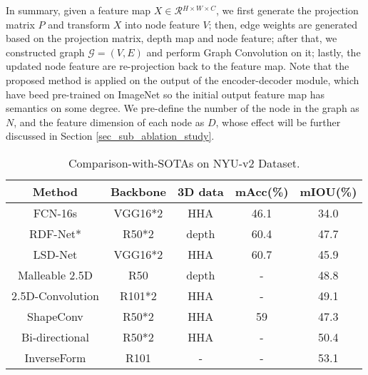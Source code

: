 ﻿\documentclass[journal]{IEEEtran}
\begin{document}
        In summary, given a feature map ${X} \in \mathcal{R}{^{H\times W\times C}}$, we first generate the projection matrix ${P}$ and transform $X$ into node feature $V$; then, edge weights are generated based on the projection matrix, depth map and node feature; after that, we constructed graph  $\mathcal{G}=(V, E)$ and perform Graph Convolution on it; lastly, the updated node feature are re-projection back to the feature map. Note that the proposed method is applied on the output of the encoder-decoder module, which have beed pre-trained on ImageNet so the initial output feature map has semantics on some degree. We pre-define the number of the node in the graph as $N$, and the feature dimension of each node as $D$, whose effect will be further discussed in Section \ref{sec_sub_ablation_study}.  


    \begin{table}
        \caption{Comparison-with-SOTAs on NYU-v2 Dataset.}\label{table_nyu_sota}
        \centering
        \begin{tabular}{c|c|c|c|c}
            \hline
            Method & Backbone & 3D data & mAcc(\%) & mIOU(\%) \\
            \hline
            FCN-16s\cite{long2015fully}  & VGG16*2 & HHA & 46.1 & 34.0 \\
    
            RDF-Net* \cite{park2017rdfnet} & R50*2 & depth & 60.4 & 47.7 \\
    
            LSD-Net \cite{cheng2017locality} & VGG16*2 & HHA & 60.7 & 45.9 \\    
    
            Malleable 2.5D \cite{2020malleable} & R50 & depth & - &  48.8 \\    
    
            2.5D-Convolution \cite{xing201925DConv} & R101*2 & HHA & - &  49.1 \\    
            
            ShapeConv \cite{2021shapeconv} &  R50*2  &  HHA & 59 & 47.3 \\    
    
            Bi-directional \cite{chen2020bi} &  R50*2  & HHA &  - & 50.4 \\    
     
    
            InverseForm \cite{borse2021inverseform}&  R101  & - &  - & 53.1 \\    
    

\end{tabular}
\end{table}
\end{document}
